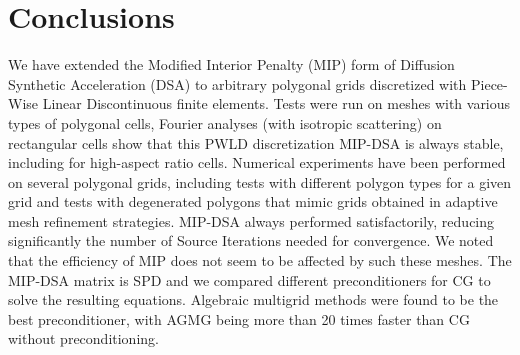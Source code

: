 \section{Conclusions} \label{sec_conc}

We have extended the Modified Interior Penalty (MIP) form of Diffusion Synthetic Acceleration (DSA) 
to arbitrary polygonal grids discretized with Piece-Wise Linear Discontinuous finite elements. 
Tests were run on meshes with various types of polygonal cells,
Fourier analyses (with isotropic scattering) on rectangular cells show
that this PWLD discretization MIP-DSA is always stable, including for high-aspect ratio cells. 
Numerical experiments have been performed on several polygonal grids, including
tests with different polygon types for a given grid and tests with degenerated polygons that mimic
grids obtained in adaptive mesh refinement strategies. MIP-DSA always performed satisfactorily,
reducing significantly the number of  Source Iterations needed for convergence. 
We noted that the efficiency of MIP does not seem to be affected by such these meshes. 
The MIP-DSA matrix is SPD and we compared different preconditioners for CG to solve the resulting equations. 
Algebraic multigrid methods were found to be the best preconditioner, with AGMG being more than 20 times
faster than CG without preconditioning.

